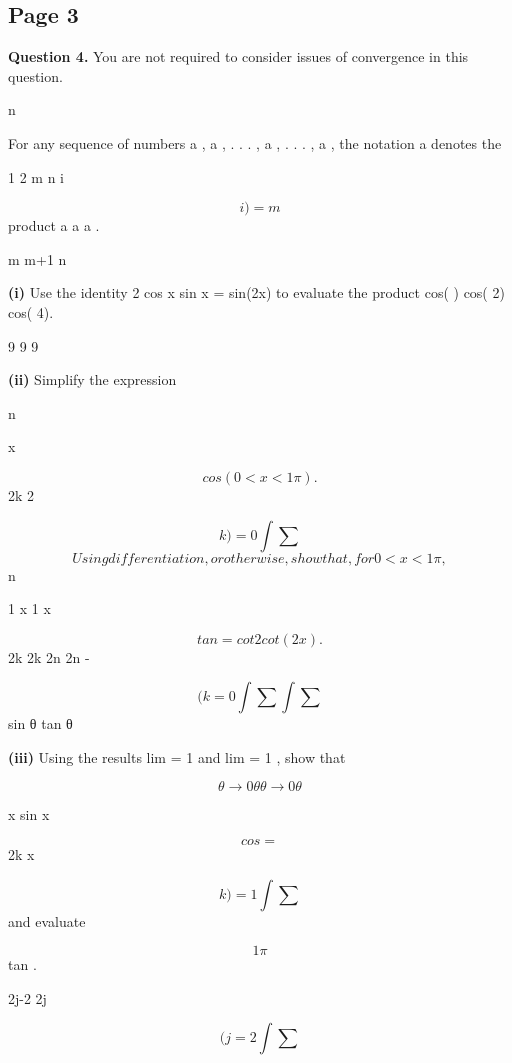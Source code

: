 \documentclass[12pt]{article}
\begin{document}
\subsection*{Page 3}
\begin{flushleft}
\bigskip\textbf{Question 4.} You are not required to consider issues of convergence in this question.\par
n\par
For any sequence of numbers a , a , . . . , a , . . . , a , the notation a denotes the\par
1 2 m n i\par
\[i)=m\]
product a a a .\par
m m+1 n\par
\cdots\par
\textbf{(i)} Use the identity 2 cos x sin x = sin(2x) to evaluate the product cos( \pi ) cos( 2\pi ) cos( 4\pi ).\par
9 9 9\par
\textbf{(ii)} Simplify the expression\par
n\par
x\par
\[cos (0 < x < 1 \pi).\]
2k 2\par
\[k)=0 \int \sum\]
\[Using differentiation, or otherwise, show that, for 0 < x < 1 \pi,\]
n\par
1 x 1 x\par
\[tan = cot 2 cot(2x).\]
2k 2k 2n 2n -\par
\[(k=0 \int \sum \int \sum\]
sin θ tan θ\par
\textbf{(iii)} Using the results lim = 1 and lim = 1 , show that\par
\[θ\to0 θ θ\to0 θ\]
\infty\par
x sin x\par
\[cos =\]
2k x\par
\[k)=1 \int \sum\]
and evaluate\par
\infty\par
\[1 \pi\]
tan .\par
2j-2 2j\par
\[(j=2 \int \sum\]
\end{flushleft}
\end{document}
